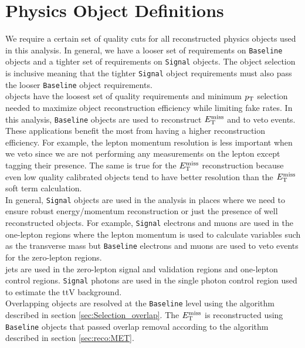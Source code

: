 \chapter{Physics Object Definitions}
\label{chap:objects}

\indent We require a certain set of quality cuts for all reconstructed physics objects used in this analysis.  In general, we have a looser set of requirements on {\tt Baseline} objects and a tighter set of requirements on {\tt Signal} objects.  The object selection is inclusive meaning that the tighter {\tt Signal} object requirements must also pass the looser {\tt Baseline} object requirements.  \\

 objects have the loosest set of quality requirements and minimum $p_{\mathrm{T}}$ selection needed to maximize object reconstruction efficiency while limiting fake rates.  In this analysis, {\tt Baseline} objects are used to reconstruct $E_{\mathrm{T}}^{\mathrm{miss}}$ and to veto events.  These applications benefit the most from having a higher reconstruction efficiency.  For example, the lepton momentum resolution is less important when we veto since we are not performing any measurements on the lepton except tagging their presence.  The same is true for the $E_{\mathrm{T}}^{\mathrm{miss}}$ reconstruction because even low quality calibrated objects tend to have better resolution than the $E_{\mathrm{T}}^{\mathrm{miss}}$ soft term calculation.  \\

\indent In general, {\tt Signal} objects are used in the analysis in places where we need to ensure robust energy/momentum reconstruction or just the presence of well reconstructed objects.  For example, {\tt Signal} electrons and muons are used in the one-lepton regions where the lepton momentum is used to calculate variables such as the transverse mass but {\tt Baseline} electrons and muons are used to veto events for the zero-lepton regions. \\

 jets are used in the zero-lepton signal and validation regions and one-lepton control regions.  {\tt Signal} photons are used in the single photon control region used to estimate the ttV background. \\

\indent Overlapping objects are resolved at the {\tt Baseline} level using the algorithm described in section \ref{sec:Selection_overlap}.  The $E_{\mathrm{T}}^{\mathrm{miss}}$ is reconstructed using {\tt Baseline} objects that passed overlap removal according to the algorithm described in section \ref{sec:reco:MET}. \\

